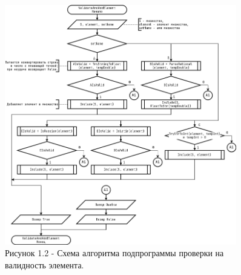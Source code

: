 \documentclass[oneside,a4paper,14pt]{extarticle}
\begin{document}
\clearpage
\begin{figure}[H]
	\centering
	\includegraphics[width=0.9\textwidth]{pics/flowchart2.png}
	\caption*{Рисунок 1.2 - Схема алгоритма подпрограммы проверки на валидность элемента.}
\end{figure}
\end{document}

